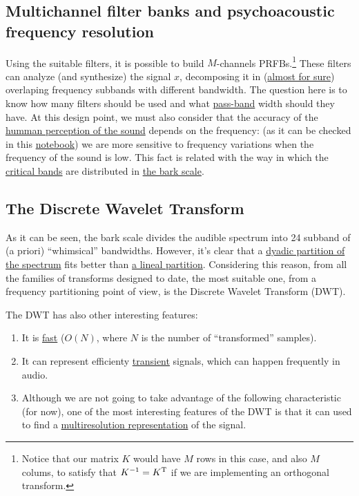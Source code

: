 \subsection{Multichannel filter banks and psychoacoustic frequency resolution}
Using the suitable filters, it is possible to build $M$-channels
PRFBs.\footnote{Notice that our matrix $K$ would have $M$ rows in this
case, and also $M$ colums, to satisfy that $K^{-1}=K^{\text T}$ if we
are implementing an orthogonal transform.}  These filters can analyze
(and synthesize) the signal $x$, decomposing it in
(\href{https://en.wikipedia.org/wiki/Low-pass_filter#Ideal_and_real_filters}{almost
  for sure}) overlaping frequency subbands with different
bandwidth. The question here is to know how many filters should be
used and what
\href{https://en.wikipedia.org/wiki/Band-pass_filter}{pass-band} width
should they have. At this design point, we must also consider that the
accuracy of the
\href{https://en.wikipedia.org/wiki/Psychoacoustics}{humman perception
  of the sound} depends on the frequency: (as it can be checked in this
\href{https://github.com/Tecnologias-multimedia/intercom/blob/master/docs/frequency_resolution.ipynb}{notebook})
we are more sensitive to frequency variations when the frequency of
the sound is low. This fact is related with the way in which the
\href{https://en.wikipedia.org/wiki/Critical_band}{critical bands} are
distributed in \href{https://en.wikipedia.org/wiki/Bark_scale}{the
  bark scale}.

\subsection{The Discrete Wavelet Transform}
As it can be seen, the bark scale divides the audible spectrum into 24
subband of (a priori) ``whimsical'' bandwidths. However, it's clear
that a \href{https://en.wikipedia.org/wiki/Octave_band}{dyadic
  partition of the spectrum} fits better than
\href{https://en.wikipedia.org/wiki/Wavelet_transform#Principle}{a
  lineal partition}. Considering this reason, from all the families of
transforms designed to date, the most suitable one, from a frequency
partitioning point of view, is the Discrete Wavelet Transform (DWT).

The DWT has also other interesting features:
\begin{enumerate}
\item It is
  \href{https://en.wikipedia.org/wiki/Discrete_wavelet_transform#Time_complexity}{fast}
  ($O(N)$, where $N$ is the number of ``transformed'' samples).
\item It can represent efficienty
  \href{https://en.wikipedia.org/wiki/Transient_(oscillation)}{transient}
  signals, which can happen frequently in audio.
\item Although we are not going to take advantage of the following
  characteristic (for now), one of the most interesting features of
  the DWT is that it can used to find a
  \href{https://en.wikipedia.org/wiki/Multiresolution_analysis}{multiresolution
    representation} of the signal.
\end{enumerate}

